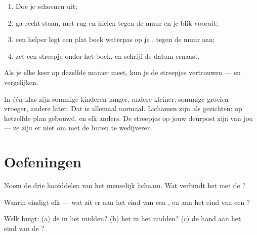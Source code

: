 \begin{method}\label{met:g1:my-body:measure}
\begin{enumerate}
  \item Doe je schoenen uit;
  \item ga recht staan, met rug en hielen tegen de muur en je blik
        vooruit;
  \item een helper legt een plat boek waterpas op je , tegen de
        muur aan;
  \item zet een streepje onder het boek, en schrijf de datum ernaast.
\end{enumerate}
Als je elke keer op dezelfde manier meet, kun je de streepjes
vertrouwen --- en vergelijken.
\end{method}

\begin{remark}\label{rem:g1:my-body:different}
In één klas zijn sommige kinderen langer, andere kleiner; sommige
groeien vroeger, andere later. Dat is allemaal normaal. Lichamen zijn
als gezichten: op hetzelfde plan gebouwd, en elk anders. De streepjes
op jouw deurpost zijn van jou --- ze zijn er niet om met de buren te wedijveren.
\end{remark}

\section{Oefeningen}

\begin{exercise}[$\star$]\label{exo:g1:my-body:1}
Noem de drie hoofddelen van het menselijk lichaam. Wat verbindt het
 met de ?
\end{exercise}

\begin{exercise}[$\star$]\label{exo:g1:my-body:2}
Waarin eindigt elk  --- wat zit er aan het eind van een , en
aan het eind van een ?
\end{exercise}

\begin{exercise}[$\star$]\label{exo:g1:my-body:3}
Welk  buigt: (a) de  in het midden? (b) het  in het
midden? (c) de hand aan het eind van de ?
\end{exercise}

